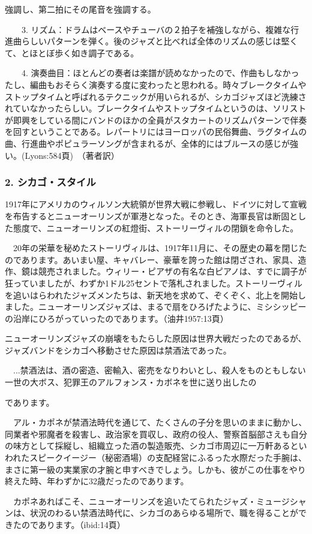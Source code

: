 \begin{gquote}
強調し、第二拍にその尾音を強調する。\par{}　　3. リズム：ドラムはベースやチューバの２拍子を補強しながら、複雑な行進曲らしいパターンを弾く。後のジャズと比べれば全体のリズムの感じは堅くて、とほとぼ歩く如き調子である。\par{}　　4. 演奏曲目：ほとんどの奏者は楽譜が読めなかったので、作曲もしなかったし、編曲もおそらく演奏する度に変わったと思われる。時々ブレークタイムやストップタイムと呼ばれるテクニックが用いられるが、シカゴジャズほど洗練されていなかったらしい。ブレークタイムやストップタイムというのは、ソリストが即興をしている間にバンドのほかの全員がスタカートのリズムパターンで伴奏を回すということである。レパートリにはヨーロッパの民俗舞曲、ラグタイムの曲、行進曲やポピュラーソングが含まれるが、全体的にはブルースの感じが強い。(Lyons:584頁)　（著者訳）
\end{gquote}

\subsubsection{2. シカゴ・スタイル}

1917年にアメリカのウィルソン大統領が世界大戦に参戦し、ドイツに対して宣戦を布告するとニューオーリンズが軍港となった。そのとき、海軍長官は断固とした態度で、ニューオーリンズの紅燈街、ストーリーヴィルの閉鎖を命令した。

\begin{gquote}
　20年の栄華を秘めたストーリヴィルは、1917年11月に、その歴史の幕を閉じたのであります。あいまい屋、キャバレー、豪華を誇った館は閉ざされ、家具、造作、鏡は競売されました。ウィリー・ピアザの有名な白ピアノは、すでに調子が狂っていましたが、わずか1ドル25セントで落札されました。ストーリーヴィルを追いはらわれたジャズメンたちは、新天地を求めて、ぞくぞく、北上を開始しました。ニューオーリンズジャズは、まるで扇をひろげたように、ミシシッピーの沿岸にひろがっていったのであります。（油井1957:13頁）
\end{gquote}

ニューオーリンズジャズの崩壊をもたらした原因は世界大戦だったのであるが、ジャズバンドをシカゴへ移動させた原因は禁酒法であった。

\begin{gquote}
　...禁酒法は、酒の密造、密輸入、密売をなりわいとし、殺人をものともしない一世の大ボス、犯罪王のアルフォンス・カボネを世に送り出したの
\end{gquote}

\begin{gquote}
であります。\par{}　アル・カポネが禁酒法時代を通じて、たくさんの子分を思いのままに動かし、同業者や邪魔者を殺害し、政治家を買収し、政府の役人、警察首脳部さえも自分の味方として採縦し、組織立った酒の製造販売、シカゴ市周辺に一万軒あるといわれたスピークイージー（秘密酒場）の支配経営にふるった水際だった手腕は、まさに第一級の実業家の才腕と申すべきでしょう。しかも、彼がこの仕事をやり終えた時、年わずかに32歳だったのであります。\par{}　カポネあればこそ、ニューオーリンズを追いたてられたジャズ・ミュージシャンは、状況のわるい禁酒法時代に、シカゴのあらゆる場所で、職を得ることができたのであります。（ibid:14頁）
\end{gquote}

